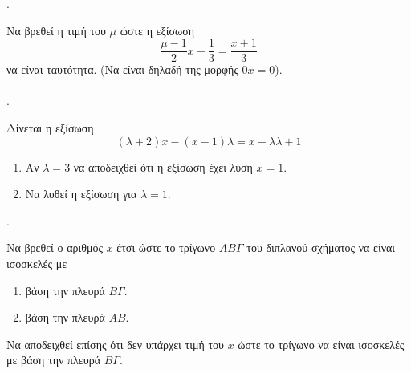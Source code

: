 \documentclass[11pt,a4paper,twocolumn]{article}
\newcounter{askhsh}
\newcommand{\askhsh}{{\large\theaskhsh.}\ \addtocounter{askhsh}{1}}
\begin{document}
\askhsh Να βρεθεί η τιμή του $ \mu $ ώστε η εξίσωση \[ \dfrac{\mu-1}{2}x+\dfrac{1}{3}=\dfrac{x+1}{3} \] να είναι ταυτότητα. (Να είναι δηλαδή της μορφής $ 0x=0 $).\\\\
\askhsh Δίνεται η εξίσωση \[ (\lambda+2)x-(x-1)\lambda=x+\lambda\lambda+1 \]
\begin{enumerate}[label=\roman*.,itemsep=0mm]
\item Αν $ \lambda=3 $ να αποδειχθεί ότι η εξίσωση έχει λύση $ x=1 $.
\item Να λυθεί η εξίσωση για $ \lambda=1 $.
\end{enumerate}
\askhsh Να βρεθεί ο αριθμός $ x $ έτσι ώστε το τρίγωνο $AB\varGamma$ του διπλανού σχήματος να είναι ισοσκελές με 
\begin{enumerate}[itemsep=0mm,label=\roman*.]
\item βάση την πλευρά $B\varGamma$.
\item βάση την πλευρά $AB$.
\end{enumerate}
Να αποδειχθεί επίσης ότι δεν υπάρχει τιμή του $x$ ώστε το τρίγωνο να είναι ισοσκελές με βάση την πλευρά $B\varGamma$.
\end{document}
